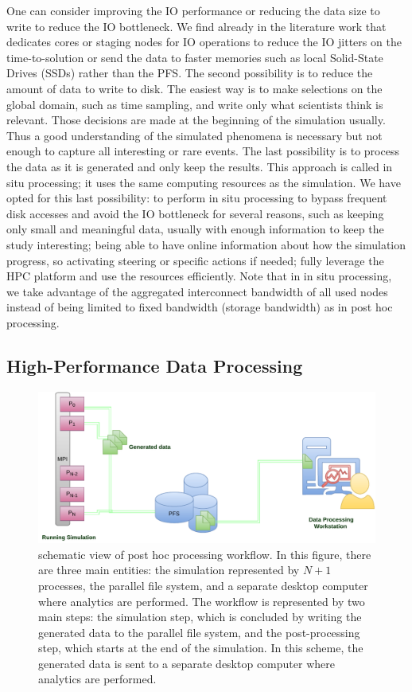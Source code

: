 One can consider improving the IO performance or reducing the data size to write to reduce the IO bottleneck. We find already in the literature work that dedicates cores or staging nodes for IO operations to reduce the IO jitters on the time-to-solution or send the data to faster memories such as local Solid-State Drives (SSDs) rather than the PFS. 
The second possibility is to reduce the amount of data to write to disk. The easiest way is to make selections on the global domain, such as time sampling, and write only what scientists think is relevant. 
Those decisions are made at the beginning of the simulation usually. Thus a good understanding of the simulated phenomena is necessary but not enough to capture all interesting or rare events. 
The last possibility is to process the data as it is generated and only keep the results. This approach is called in situ processing; it uses the same computing resources as the simulation. 
We have opted for this last possibility: to perform in situ processing to bypass frequent disk accesses and avoid the IO bottleneck for several reasons, such as keeping only small and meaningful data, usually with enough information to keep the study interesting; being able to have online information about how the simulation progress, so activating steering or specific actions if needed; fully leverage the HPC platform and use the resources efficiently.  
Note that in in situ processing, we take advantage of the aggregated interconnect bandwidth of all used nodes instead of being limited to fixed bandwidth (storage bandwidth) as in post hoc processing.

\subsection{High-Performance Data Processing}

\begin{figure}[tb]\centering
\includegraphics[scale=0.9]{figures/posthoc.pdf}
\caption{schematic view of post hoc processing workflow. In this figure, there are three main entities: the simulation represented by $N+1$ processes, the parallel file system, and a separate desktop computer where analytics are performed.  
The workflow is represented by two main steps: the simulation step, which is concluded by writing the generated data to the parallel file system, and the post-processing step, which starts at the end of the simulation. In this scheme, the generated data is sent to a separate desktop computer where analytics are performed.}
\label{figposthoc}
\end{figure}

